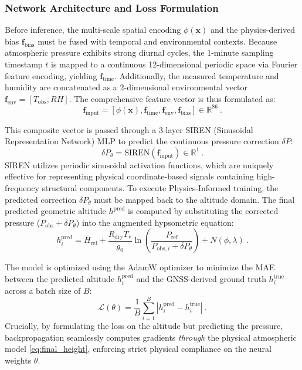\subsubsection{Network Architecture and Loss Formulation}
Before inference, the multi-scale spatial encoding $\phi(\mathbf{x})$ and the physics-derived bias $\mathbf{f}_{\text{bias}}$ must be fused with temporal and environmental contexts. Because atmospheric pressure exhibits strong diurnal cycles, the 1-minute sampling timestamp $t$ is mapped to a continuous 12-dimensional periodic space via Fourier feature encoding, yielding $\mathbf{f}_{\text{time}}$. Additionally, the measured temperature and humidity are concatenated as a 2-dimensional environmental vector $\mathbf{f}_{\text{env}} = [T_{\text{obs}}, RH]$. The comprehensive feature vector is thus formulated as:
\begin{equation}
\mathbf{f}_{\text{input}} = [\phi(\mathbf{x}), \mathbf{f}_{\text{time}}, \mathbf{f}_{\text{env}}, \mathbf{f}_{\text{bias}}] \in \mathbb{R}^{86} \ .
\label{eq:fused_features}
\end{equation}

This composite vector is passed through a 3-layer SIREN (Sinusoidal Representation Network) MLP to predict the continuous pressure correction $\delta P$:
\begin{equation}
\delta P_\theta = \text{SIREN}(\mathbf{f}_{\text{input}}) \in \mathbb{R}^1 \ .
\label{eq:mlp_output}
\end{equation}
SIREN utilizes periodic sinusoidal activation functions, which are uniquely effective for representing physical coordinate-based signals containing high-frequency structural components. To execute Physics-Informed training, the predicted correction $\delta P_\theta$ must be mapped back to the altitude domain. The final predicted geometric altitude $h^{\text{pred}}$ is computed by substituting the corrected pressure ($P_{\text{obs}} + \delta P_\theta$) into the augmented hypsometric equation:
\begin{equation}
h^{\text{pred}}_i = H_{\text{ref}} + \frac{R_{\text{dry}} T_\text{v}}{g_0} \ln\left(\frac{P_{\text{ref}}}{P_{\text{obs},i} + \delta P_\theta}\right) + N(\phi, \lambda) \ .
\label{eq:final_height}
\end{equation}

The model is optimized using the AdamW optimizer \cite{loshchilov2017decoupled} to minimize the MAE between the predicted altitude $h^{\text{pred}}_i$ and the GNSS-derived ground truth $h^{\text{true}}_i$ across a batch size of $B$:
\begin{equation}
\mathcal{L}(\theta) = \frac{1}{B} \sum_{i=1}^B \left| h^{\text{pred}}_i - h^{\text{true}}_i \right| \ .
\label{eq:loss_function}
\end{equation}
Crucially, by formulating the loss on the altitude but predicting the pressure, backpropagation seamlessly computes gradients \textit{through} the physical atmospheric model \eqref{eq:final_height}, enforcing strict physical compliance on the neural weights $\theta$.

